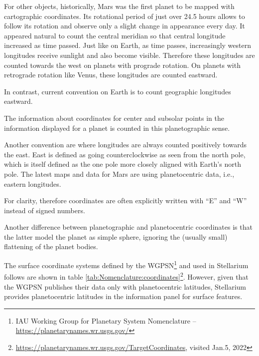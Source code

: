For other objects, historically, Mars was the first planet to be
mapped with cartographic coordinates. Its rotational period of just
over 24.5 hours allows to follow its rotation and observe only a
slight change in appearance every day. It appeared natural to count
the central meridian so that central longitude increased as time
passed. Just like on Earth, as time passes, increasingly western
longitudes receive sunlight and also become visible. Therefore these
 longitudes are
counted towards the west on planets with prograde rotation.  On
planets with retrograde rotation like Venus, these longitudes are
counted eastward.

In contrast, current convention on Earth is to count geographic
longitudes eastward.

The information about coordinates for center and subsolar points in
the information displayed for a planet is counted in this
planetographic sense.

Another convention are
where longitudes are always counted positively towards the east. East
is defined as going counterclockwise as seen from the north pole,
which is itself defined as the one pole more closely aligned with
Earth's north pole. The latest maps and data for Mars are using
planetocentric data, i.e., eastern longitudes.

For clarity, therefore coordinates are often explicitly written with ``E'' and
``W'' instead of signed numbers.


Another difference between planetographic and planetocentric
coordinates is that the latter model the planet as simple sphere,
ignoring the (usually small) flattening of the planet bodies.

The surface coordinate systems defined by the WGPSN\footnote{IAU
  Working Group for Planetary System Nomenclature --
  \url{https://planetarynames.wr.usgs.gov/}} and used in Stellarium
follows are shown in table
\ref{tab:Nomenclature:coordinates}\footnote{\url{https://planetarynames.wr.usgs.gov/TargetCoordinates},
  visited Jan.5, 2022}. However, given that the WGPSN publishes their
data only with planetocentric latitudes, Stellarium provides planetocentric latitudes
in the information panel for surface features.

